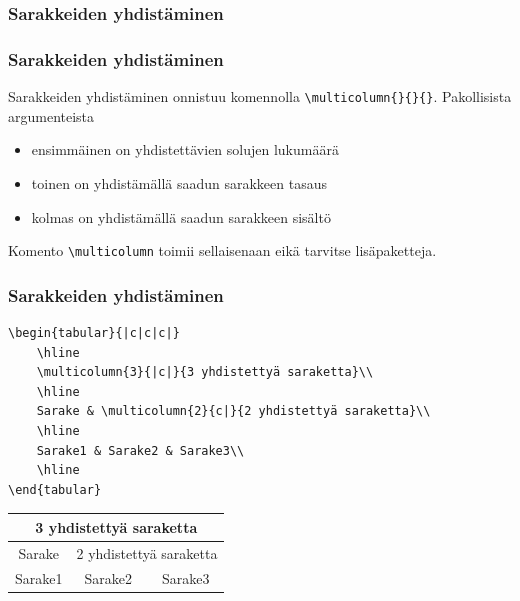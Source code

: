 \subsubsection{Sarakkeiden yhdistäminen}
\begin{frame}[fragile]
    \frametitle{Sarakkeiden yhdistäminen}
    Sarakkeiden yhdistäminen onnistuu komennolla \verb-\multicolumn{}{}{}-. Pakollisista argumenteista
    \begin{itemize}
        \item ensimmäinen on yhdistettävien solujen lukumäärä
        \item toinen on yhdistämällä saadun sarakkeen tasaus
        \item kolmas on yhdistämällä saadun sarakkeen sisältö
    \end{itemize}
    Komento \verb-\multicolumn- toimii sellaisenaan eikä tarvitse lisäpaketteja.
\end{frame}
\begin{frame}[fragile]
    \frametitle{Sarakkeiden yhdistäminen}
    \begin{scriptsize}
        \begin{Verbatim}[frame=single]
\begin{tabular}{|c|c|c|}
    \hline
    \multicolumn{3}{|c|}{3 yhdistettyä saraketta}\\
    \hline
    Sarake & \multicolumn{2}{c|}{2 yhdistettyä saraketta}\\
    \hline
    Sarake1 & Sarake2 & Sarake3\\
    \hline
\end{tabular}
        \end{Verbatim}
    \end{scriptsize}
    \begin{minipage}{5cm}
        \begin{serif}
            \begin{scriptsize}
                \begin{tabular}{|c|c|c|}
                    \hline
                    \multicolumn{3}{|c|}{3 yhdistettyä saraketta}\\
                    \hline
                    Sarake & \multicolumn{2}{c|}{2 yhdistettyä saraketta}\\
                    \hline
                    Sarake1 & Sarake2 & Sarake3\\
                    \hline
                \end{tabular}
            \end{scriptsize}
        \end{serif}
    \end{minipage}
\end{frame}

